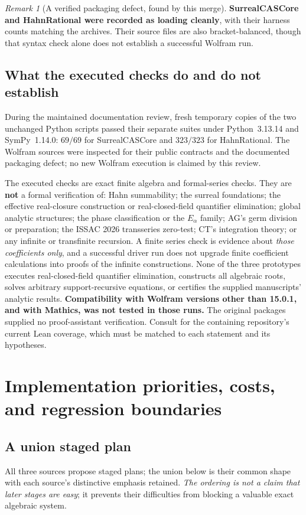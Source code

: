 \documentclass[11pt,letterpaper]{article}
\numberwithin{equation}{section}
\theoremstyle{definition}
\theoremstyle{remark}
\newtheorem{remark}[theorem]{Remark}
\begin{document}
\begin{remark}[A verified packaging defect, found by this merge]
\textbf{SurrealCASCore and HahnRational were recorded as loading cleanly}, with
their harness counts matching the archives. Their source files are also
bracket-balanced, though that syntax check alone does not establish a successful
Wolfram run.
\end{remark}

\subsection{What the executed checks do and do not establish}
\label{cas:sub-checkscope}
During the maintained documentation review, fresh temporary copies of the two
unchanged Python scripts passed their separate suites under Python~3.13.14 and
SymPy~1.14.0: $69/69$ for SurrealCASCore and $323/323$ for HahnRational. The
Wolfram sources were inspected for their public contracts and the documented
packaging defect; no new Wolfram execution is claimed by this review.

The executed checks are exact finite algebra and formal-series checks. They are
\textbf{not} a formal verification of: Hahn summability; the surreal
foundations; the effective real-closure construction or real-closed-field
quantifier elimination; global analytic structures; the phase classification or
the $E_\alpha$ family; AG's germ division or preparation; the ISSAC 2026
transseries zero-test; CT's integration theory; or any infinite or transfinite
recursion. A finite series check is evidence about \emph{those coefficients
only}, and a successful driver run does not upgrade finite coefficient
calculations into proofs of the infinite constructions. None of the three
prototypes executes real-closed-field quantifier elimination, constructs all
algebraic roots, solves arbitrary support-recursive equations, or certifies the
supplied manuscripts' analytic results. \textbf{Compatibility with Wolfram
versions other than 15.0.1, and with Mathics, was not tested in those runs.}
The original packages supplied no proof-assistant verification. Consult
 for the containing repository's current Lean
coverage, which must be matched to each statement and its hypotheses.

\section{Implementation priorities, costs, and regression boundaries}
\label{cas:sec-roadmap}

\subsection{A union staged plan}
\label{cas:sub-stages}
All three sources propose staged plans; the union below is their common shape
with each source's distinctive emphasis retained. \emph{The ordering is not a
claim that later stages are easy}; it prevents their difficulties from blocking
a valuable exact algebraic system.
\end{document}
